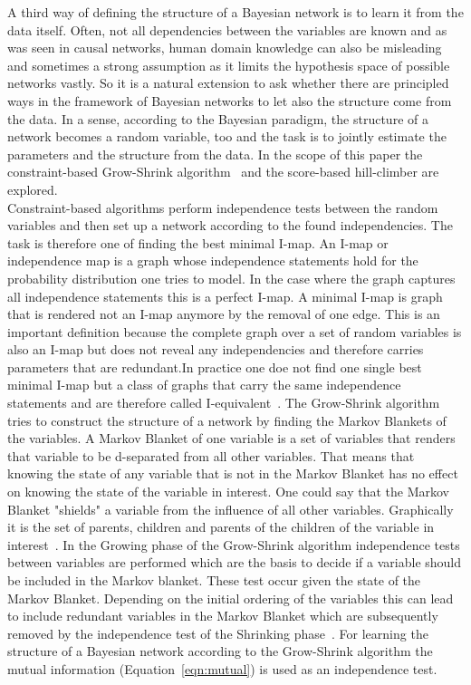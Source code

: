 A third way of defining the structure of a Bayesian network is to learn it from the data itself. Often, not all dependencies between the variables are known and as was seen in causal networks, human domain knowledge can also be misleading and sometimes a strong assumption as it limits the hypothesis space of possible networks vastly. So it is a natural extension to ask whether there are principled ways in the framework of Bayesian networks to let also the structure come from the data. In a sense, according to the Bayesian paradigm, the structure of a network becomes a random variable, too and the task is to jointly estimate the parameters and the structure from the data. In the scope of this paper the constraint-based Grow-Shrink algorithm~\citep{margaritis2003} and the score-based hill-climber are explored.\\
Constraint-based algorithms perform independence tests between the random variables and then set up a network according to the found independencies. The task is therefore one of finding the best minimal I-map. An I-map or independence map is a graph whose independence statements hold for the probability distribution one tries to model. In the case where the graph captures all independence statements this is a perfect I-map. A minimal I-map is graph that is rendered not an I-map anymore by the removal of one edge. This is an important definition because the complete graph over a set of random variables is also an I-map but does not reveal any independencies and therefore carries parameters that are redundant.In practice one doe not find one single best minimal I-map but a class of graphs that carry the same independence statements and are therefore called I-equivalent~\citep{koller2009}. 
The Grow-Shrink algorithm tries to construct the structure of a network by finding the Markov Blankets of the variables. A Markov Blanket of one variable is a set of variables that renders that variable to be d-separated from all other variables. That means that knowing the state of any variable that is not in the Markov Blanket has no effect on knowing the state of the variable in interest. One could say that the Markov Blanket "shields" a variable from the influence of all other variables. Graphically it is the set of parents, children and parents of the children of the variable in interest~\citep{koller2009}. In the Growing phase of the Grow-Shrink algorithm independence tests between variables are performed which are the basis to decide if a variable should be included in the Markov blanket. These test occur given the state of the Markov Blanket. Depending on the initial ordering of the variables this can lead to include redundant variables in the Markov Blanket which are subsequently removed by the independence test of the Shrinking phase~\citep{margaritis2003}. For learning the structure of a Bayesian network according to the Grow-Shrink algorithm the mutual information (Equation~\ref{eqn:mutual}) is used as an independence test.

